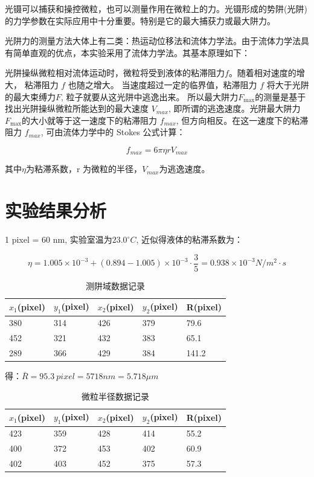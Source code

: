 \documentclass[a4paper,UTF8]{ctexart}
\begin{document}
光镊可以捕获和操控微粒，也可以测量作用在微粒上的力。光镊形成的势阱(光阱) 的力学参数在实际应用中十分重要。特别是它的最大捕获力或最大阱力。

光阱力的测量方法大体上有二类：热运动位移法和流体力学法。由于流体力学法具有简单直观的优点，本实验采用了流体力学法。其基本原理如下：

光阱操纵微粒相对流体运动时，微粒将受到液体的粘滞阻力$f$。随着相对速度的增大， 粘滞阻力 $f$ 也随之增大。
当速度超过一定的临界值，粘滞阻力 $f$ 将大于光阱的最大束缚力$F$, 粒子就要从这光阱中逃逸出来。
所以最大阱力${F}_\mathrm{max}$的测量是基于找出光阱操纵微粒所能达到的最大速度 $V_{max}$,
即所谓的逃逸速度。光阱最大阱力 ${F}_\mathrm{max}$的大小就等于这一速度下的粘滞阻力
 $f_{max}$, 但方向相反。在这一速度下的粘滞阻力 $f_{max}$, 可由流体力学中的 Stokes 公式计算：

\begin{equation}
    f_{max}=6\pi \eta r V_{max}
\end{equation}

其中$\eta$为粘滞系数，r 为微粒的半径，$V_{max}$为逃逸速度。

\section{实验结果分析}

1 pixel = 60 nm, 实验室温为$23.0^{\circ}C$, 近似得液体的粘滞系数为：

\begin{equation}
    \eta = 1.005\times 10^{-3} + (0.894-1.005)\times 10^{-3}\cdot \frac{3}{5}  = 0.938 \times 10^{-3} N/m^2\cdot s
\end{equation}

\begin{table}[H]
    \centering
    \caption{测阱域数据记录}
    \begin{tabular}{|l|l|l|l|l|}
    \hline
        $x_1$(pixel) & $y_1$(pixel) & $x_2$(pixel) & $y_2$(pixel) & R(pixel) \\ \hline
        380 & 314 & 426 & 379 & 79.6 \\ \hline
        452 & 321 & 432 & 383 & 65.1 \\ \hline
        289 & 366 & 429 & 384 & 141.2 \\ \hline
    \end{tabular}
\end{table}

得：$\bar{R} = 95.3 \ pixel = 5718 nm = 5.718 \mu m $

\begin{table}[H]
    \centering
    \caption{微粒半径数据记录}
    \begin{tabular}{|l|l|l|l|l|}
    \hline
        $x_1$(pixel) & $y_1$(pixel) & $x_2$(pixel) & $y_2$(pixel) & R(pixel) \\ \hline
        423 & 359 & 428 & 414 & 55.2 \\ \hline
        400 & 372 & 453 & 402 & 60.9 \\ \hline
        402 & 403 & 452 & 375 & 57.3 \\ \hline
    \end{tabular}
\end{table}
\end{document}
